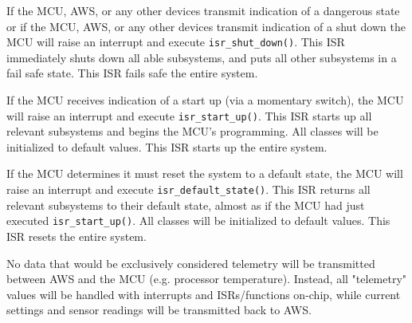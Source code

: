 \begin{flushleft}
    If the MCU, AWS, or any other devices transmit indication of a dangerous
    state or if the MCU, AWS, or any other devices transmit indication of a
    shut down the MCU will raise an interrupt and execute
    \texttt{isr\_shut\_down()}. This ISR immediately shuts down all able
    subsystems, and puts all other subsystems in a fail safe state. This ISR
    fails safe the entire system.
\end{flushleft}
\begin{flushleft}
    If the MCU receives indication of a start up (via a momentary switch), the
    MCU will raise an interrupt and execute \texttt{isr\_start\_up()}. This ISR
    starts up all relevant subsystems and begins the MCU's programming. All
    classes will be initialized to default values. This ISR starts up the
    entire system.
\end{flushleft}
\begin{flushleft}
    If the MCU determines it must reset the system to a default state, the
    MCU will raise an interrupt and execute \texttt{isr\_default\_state()}.
    This ISR returns all relevant subsystems to their default state, almost
    as if the MCU had just executed \texttt{isr\_start\_up()}. All classes will
    be initialized to default values. This ISR resets the entire system.
\end{flushleft}
\begin{flushleft}
\end{flushleft}
\begin{flushleft}
\end{flushleft}
\begin{flushleft}
\end{flushleft}
\begin{flushleft}
    No data that would be exclusively considered telemetry will be transmitted 
    between AWS and the MCU (e.g. processor temperature). Instead, all
    "telemetry" values will be handled with interrupts and ISRs/functions
    on-chip, while current settings and sensor readings will be transmitted
    back to AWS.
\end{flushleft}

